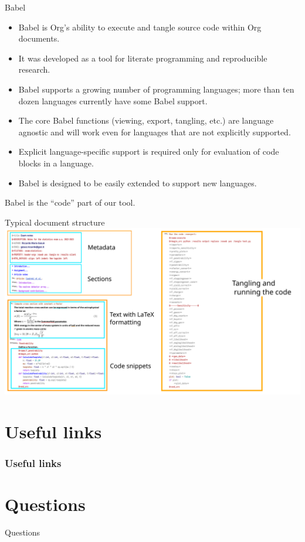 \documentclass{Gesue_PresentationTemplate}
\begin{document}
\begin{frame}{Babel}
  \begin{itemize}
    \item Babel is Org's ability to
          \alert{execute
          and tangle} source code within
          Org documents.

    \item It was developed as a tool for
          \alert{literate programming}
          and \alert{reproducible
          research}\cite{babelarticle}.
    \item Babel supports a growing number of
          programming languages; more than
          \alert{ten dozen}
          languages currently have some Babel
          support.
    \item The core Babel functions (viewing,
          export, tangling, etc.) are
          \alert{language agnostic}
          and will work even for languages
          that are not explicitly supported.
    \item Explicit language-specific support is
          required only for \alert{evaluation}
          of code blocks in a language.
    \item Babel is designed to be
          \alert{easily extended}
          to support new languages.
  \end{itemize}
\begin{exampleblock}{}
Babel is the ``code'' part of our tool.
\end{exampleblock}
\end{frame}
\begin{frame}{Typical document structure}
  \centering
  \includegraphics[width = .9\linewidth]{Images/typical_code.pdf}
\end{frame}
\section{Useful links}
\begin{frame}[allowframebreaks]
  \frametitle{Useful links}
  \printbibliography
\end{frame}
\section{Questions}
\begin{frame}{Questions}
\end{frame}
\end{document}
